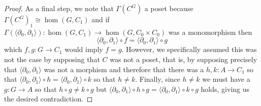 \begin{proof}
  As a final step, we note that $\Gamma(C^G)$ a poset because
  $\Gamma(C^G)_1 \cong \hom(G, C_1)$ and if
  $\Gamma(\langle \partial_0, \partial_1 \rangle) : \hom(G, C_1) \to \hom(G, C_0 \times C_0)$
  was a monomorphism then
  \[
    \langle \partial_0, \partial_1 \rangle \circ f = \langle \partial_0, \partial_1 \rangle \circ g
  \]
  which $f, g : G \to C_1$ would imply $f = g$. However, we
  specifically assumed this was not the case by supposing that $C$ was
  not a poset, that is, by supposing precisely that
  $\langle \partial_0, \partial_1 \rangle$ was not a morphism and
  therefore that there was a $h, k : A \to C_1$ so that
  $\langle \partial_0, \partial_1 \rangle \circ h = \langle \partial_0, \partial_1 \rangle \circ k$
  so that $h \neq k$. Finally, since $h \neq k$ we must have a $g : G
  \to A$ so that $h \circ g \neq k \circ g$ but
  $\langle \partial_0, \partial_1 \rangle \circ h \circ g = \langle \partial_0, \partial_1 \rangle \circ k \circ g$
  holds, giving us the desired contradiction.
\end{proof}

